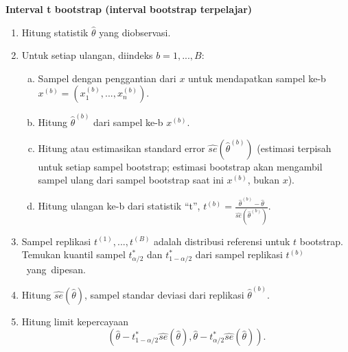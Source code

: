 \documentclass[a4paper,12pt]{article}
\theoremstyle{definition}
\begin{document}
\textbf{Interval t bootstrap (interval bootstrap terpelajar)}
\begin{enumerate}[1.]
    \item Hitung statistik $\hat{\theta}$ yang diobservasi.
    \item Untuk setiap ulangan, diindeks $b = 1, ..., B$:
        \begin{enumerate}[(a)]
            \item Sampel dengan penggantian dari $x$ untuk mendapatkan sampel ke-b $x^{(b)} = (x_{1}^{(b)}, ..., x_{n}^{(b)})$.
            \item Hitung $\hat{\theta}^{(b)}$ dari sampel ke-b $x^{(b)}$.
            \item Hitung atau estimasikan standard error $\widehat{se}(\hat{\theta}^{(b)})$ (estimasi terpisah untuk setiap sampel bootstrap; estimasi bootstrap akan mengambil sampel ulang dari sampel bootstrap saat ini $x^{(b)}$, bukan $x$).
            \item Hitung ulangan ke-b dari statistik “t”, $t^{(b)} = \frac{\hat{\theta}^{(b)}-\hat{\theta}}{\widehat{se}(\hat{\theta}^{(b)})}$.
        \end{enumerate}
    \item Sampel replikasi $t^{(1)}, ..., t^{(B)}$ adalah distribusi referensi untuk $t$ bootstrap. Temukan kuantil sampel $t_{\alpha/2}^{*}$ dan $t_{1-\alpha/2}^{*}$ dari sampel replikasi $t^{(b)}$ yang dipesan. 
    \item Hitung $\widehat{se}(\hat{\theta})$, sampel standar deviasi dari replikasi $\hat{\theta}^{(b)}$.
    \item Hitung limit kepercayaan
    \begin{equation*}
    (\hat{\theta}-t_{1-\alpha/2}^{*}\widehat{se}(\hat{\theta}),     \hat{\theta}-t_{\alpha/2}^{*}\widehat{se}(\hat{\theta})).
    \end{equation*}
\end{enumerate}
\end{document}
